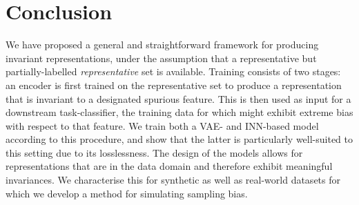 \section{Conclusion}\label{sec:conclusion}

We have proposed a general and straightforward framework for producing invariant representations, under the assumption that a representative but partially-labelled \emph{representative} set is available.
Training consists of two stages:
an encoder is first trained on the representative set to produce a representation that is invariant to a designated spurious feature. 
This is then used as input for a downstream task-classifier, the training data for which might exhibit extreme bias with respect to that feature.
We train both a VAE- and INN-based model according to this procedure, and show that the latter is particularly well-suited to this setting due to its losslessness. 
The design of the models allows for representations that are in the data domain and therefore exhibit meaningful invariances. 
We characterise this for synthetic as well as real-world datasets for which we develop a method for simulating sampling bias.